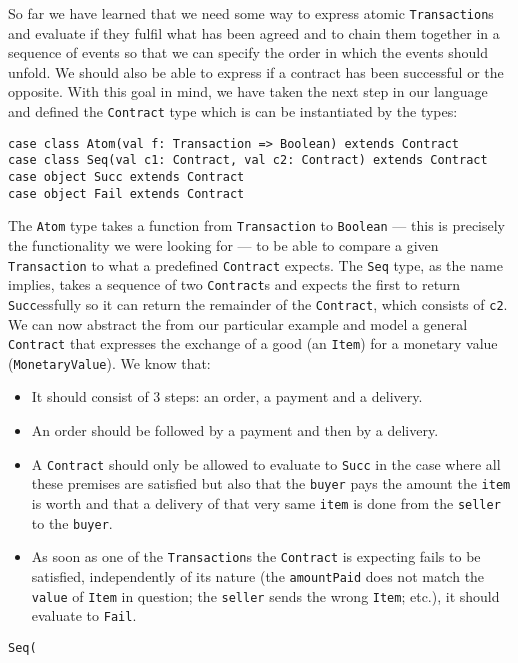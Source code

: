 \documentclass{ituthesis}
\begin{document}
So far we have learned that we need some way to express atomic \texttt{Transaction}s and evaluate if they fulfil what has been agreed and to chain them together in a sequence of events so that we can specify the order in which the events should unfold. We should also be able to express if a contract has been successful or the opposite. With this goal in mind, we have taken the next step in our language and defined the \texttt{Contract} type which is can be instantiated by the types:
\begin{lstlisting}
case class Atom(val f: Transaction => Boolean) extends Contract 
case class Seq(val c1: Contract, val c2: Contract) extends Contract
case object Succ extends Contract
case object Fail extends Contract
\end{lstlisting}
The \texttt{Atom} type takes a function from \texttt{Transaction} to \texttt{Boolean} --- this is precisely the functionality we were looking for --- to be able to compare a given \texttt{Transaction} to what a predefined \texttt{Contract} expects. The \texttt{Seq} type, as the name implies, takes a sequence of two \texttt{Contract}s and expects the first to return \texttt{Succ}essfully so it can return the remainder of the \texttt{Contract}, which consists of \texttt{c2}. We can now abstract the from our particular example and model a general \texttt{Contract} that expresses the exchange of a good (an \texttt{Item}) for a monetary value (\texttt{MonetaryValue}). We know that:
\begin{itemize}
    \item It should consist of 3 steps: an order, a payment and a delivery.
    \item An order should be followed by a payment and then by a delivery.
    \item A \texttt{Contract} should only be allowed to evaluate to \texttt{Succ} in the case where all these premises are satisfied but also that the \texttt{buyer} pays the amount the \texttt{item} is worth and that a delivery of that very same \texttt{item} is done from the \texttt{seller} to the \texttt{buyer}.
    \item As soon as one of the \texttt{Transaction}s the \texttt{Contract} is expecting fails to be satisfied, independently of its nature (the \texttt{amountPaid} does not match the \texttt{value} of \texttt{Item} in question; the \texttt{seller} sends the wrong \texttt{Item}; etc.), it should evaluate to \texttt{Fail}.
\end{itemize}
\begin{lstlisting}
Seq(
\end{lstlisting}
\end{document}
